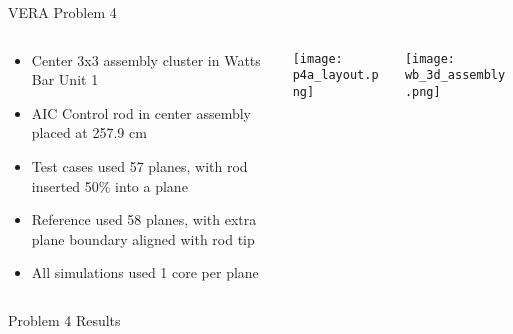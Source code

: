 \begin{frame}[t]{VERA Problem 4}
    
\begin{columns}
    \begin{column}{0.5\textwidth}
        \begin{itemize}
            \item Center 3x3 assembly cluster in Watts Bar Unit 1
            \item AIC Control rod in center assembly placed at 257.9 cm
            \item Test cases used 57 planes, with rod inserted 50\% into a plane
            \item Reference used 58 planes, with extra plane boundary aligned 
            with rod tip
            \item All simulations used 1 core per plane
        \end{itemize}
    \end{column}
    \begin{column}{0.28\textwidth}
        \texttt{[image: p4a\_layout.png]}
    \end{column}
    \begin{column}{0.22\textwidth}
        \texttt{[image: wb\_3d\_assembly.png]}
\end{column}
\end{columns}
    
\end{frame}


\begin{frame}[t]{Problem 4 Results}
    
    \begin{table}[h]
      \centering
      \caption{VERA Problem 4 Decusping Results}\label{t:p4decusp}
    \end{table}
    
\end{frame}

